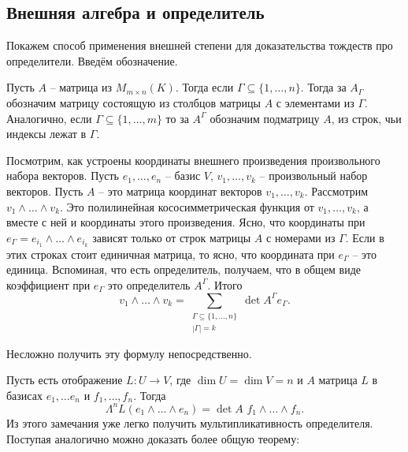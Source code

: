 \subsection{Внешняя алгебра и определитель}

Покажем способ применения внешней степени для доказательства тождеств про определители. Введём обозначение.

\dfn Пусть $A$ -- матрица из $M_{m\times n}(K)$. Тогда если $\Gamma \subseteq \{1,\dots,n\}$. Тогда за $A_{\Gamma}$ обозначим матрицу состоящую из столбцов матрицы $A$ с элементами из $\Gamma$. Аналогично, если $\Gamma \subseteq \{1,\dots,m\}$ то за $A^{\Gamma}$ обозначим подматрицу $A$, из строк, чьи индексы лежат в $\Gamma$.
\edfn

Посмотрим, как устроены координаты внешнего произведения произвольного набора векторов. Пусть $e_1,\dots,e_n$ -- базис $V$, $v_1,\dots,v_k$ --  произвольный набор векторов. Пусть $A$ -- это матрица координат векторов $v_1,\dots,v_k$.
Рассмотрим $v_1 \wedge \dots \wedge v_k$. Это полилинейная кососимметрическая функция от $v_1,\dots,v_k$, а вместе с ней и координаты этого произведения. Ясно, что координаты при $e_{\Gamma}=e_{i_1}\wedge\dots\wedge e_{i_k}$ зависят только от строк матрицы $A$ с номерами из $\Gamma$. Если в этих строках стоит единичная матрица, то ясно, что координата при $e_{\Gamma}$ -- это единица. Вспоминая, что есть определитель, получаем, что в общем виде коэффициент при $e_{\Gamma}$ это определитель $A^{\Gamma}$. Итого 
$$v_1 \wedge \dots \wedge v_k= \sum_{\substack{\Gamma \subseteq \{1,\dots,n\}\\ |\Gamma|=k}} \det A^{\Gamma} e_{\Gamma}.$$

Несложно получить эту формулу непосредственно.

Пусть есть отображение $L \colon U \to V$, где $\dim U= \dim V = n$ и $A$ матрица $L$ в базисах $e_1,\dots e_n$ и $f_1,\dots,f_n$. Тогда $$\Lambda^n L(e_1\wedge \dots \wedge e_n) = \det A \,\,f_1 \wedge \dots \wedge f_n.$$
Из этого замечания уже легко получить мультипликативность определителя. Поступая аналогично можно доказать более общую теорему:



